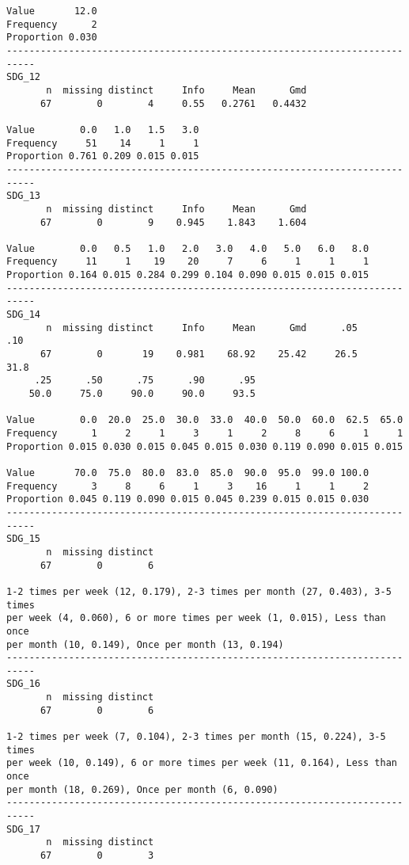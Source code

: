 \documentclass[]{article}
\begin{document}
\begin{verbatim}
Value       12.0
Frequency      2
Proportion 0.030
---------------------------------------------------------------------------
SDG_12 
       n  missing distinct     Info     Mean      Gmd 
      67        0        4     0.55   0.2761   0.4432 
                                  
Value        0.0   1.0   1.5   3.0
Frequency     51    14     1     1
Proportion 0.761 0.209 0.015 0.015
---------------------------------------------------------------------------
SDG_13 
       n  missing distinct     Info     Mean      Gmd 
      67        0        9    0.945    1.843    1.604 
                                                                
Value        0.0   0.5   1.0   2.0   3.0   4.0   5.0   6.0   8.0
Frequency     11     1    19    20     7     6     1     1     1
Proportion 0.164 0.015 0.284 0.299 0.104 0.090 0.015 0.015 0.015
---------------------------------------------------------------------------
SDG_14 
       n  missing distinct     Info     Mean      Gmd      .05      .10 
      67        0       19    0.981    68.92    25.42     26.5     31.8 
     .25      .50      .75      .90      .95 
    50.0     75.0     90.0     90.0     93.5 
                                                                      
Value        0.0  20.0  25.0  30.0  33.0  40.0  50.0  60.0  62.5  65.0
Frequency      1     2     1     3     1     2     8     6     1     1
Proportion 0.015 0.030 0.015 0.045 0.015 0.030 0.119 0.090 0.015 0.015
                                                                
Value       70.0  75.0  80.0  83.0  85.0  90.0  95.0  99.0 100.0
Frequency      3     8     6     1     3    16     1     1     2
Proportion 0.045 0.119 0.090 0.015 0.045 0.239 0.015 0.015 0.030
---------------------------------------------------------------------------
SDG_15 
       n  missing distinct 
      67        0        6 

1-2 times per week (12, 0.179), 2-3 times per month (27, 0.403), 3-5 times
per week (4, 0.060), 6 or more times per week (1, 0.015), Less than once
per month (10, 0.149), Once per month (13, 0.194)
---------------------------------------------------------------------------
SDG_16 
       n  missing distinct 
      67        0        6 

1-2 times per week (7, 0.104), 2-3 times per month (15, 0.224), 3-5 times
per week (10, 0.149), 6 or more times per week (11, 0.164), Less than once
per month (18, 0.269), Once per month (6, 0.090)
---------------------------------------------------------------------------
SDG_17 
       n  missing distinct 
      67        0        3 
                                                          

\end{verbatim}
\end{document}
